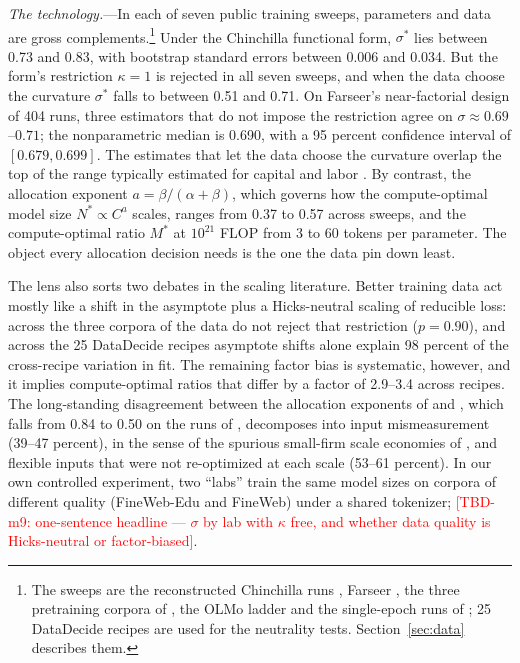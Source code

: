 \textit{The technology.}---In each of seven public training sweeps, parameters and data are gross
complements.\footnote{The sweeps are the reconstructed Chinchilla runs \citep{hoffmann2022training,
besiroglu2024chinchilla}, Farseer \citep{li2025predictableb}, the three pretraining corpora of
\citet{gadre2024language}, the OLMo ladder \citep{bhagia2024establishing} and the single-epoch runs of
\citet{muennighoff2023scaling}; 25 DataDecide recipes \citep{magnusson2025datadecide} are used for the neutrality
tests. Section~\ref{sec:data} describes them.} Under the Chinchilla functional form, $\sigma^*$ lies between 0.73
and 0.83, with bootstrap standard errors between 0.006 and 0.034. But the form's restriction $\kappa = 1$ is rejected
in all seven sweeps, and when the data choose the curvature $\sigma^*$ falls to between 0.51 and 0.71. On Farseer's
near-factorial design of 404 runs, three estimators that do not impose the restriction agree on
$\sigma \approx 0.69$--$0.71$; the nonparametric median is 0.690, with a 95 percent confidence interval of
$[0.679, 0.699]$. The estimates that let the data choose the curvature overlap the top of the range typically
estimated for capital and labor
\citep{chirinko2008sigma, oberfield2021micro}. By contrast, the allocation exponent $a = \beta/(\alpha+\beta)$, which
governs how the compute-optimal model size $N^* \propto C^{a}$ scales, ranges from 0.37 to 0.57 across sweeps, and the
compute-optimal ratio $M^*$ at $10^{21}$ FLOP from 3 to 60 tokens per parameter. The object every allocation decision
needs is the one the data pin down least.

The lens also sorts two debates in the scaling literature. Better training data act mostly like a shift in the
asymptote plus a Hicks-neutral scaling of reducible loss: across the three corpora of \citet{gadre2024language} the
data do not reject that restriction ($p = 0.90$), and across the 25 DataDecide recipes asymptote shifts alone
explain 98 percent of the cross-recipe variation in fit. The remaining factor bias is systematic, however, and it
implies compute-optimal ratios that differ by a factor of 2.9--3.4 across recipes. The long-standing disagreement
between the allocation exponents of \citet{kaplan2020scaling} and \citet{hoffmann2022training}, which falls from 0.84
to 0.50 on the runs of \citet{porian2024resolving}, decomposes into input mismeasurement (39--47 percent), in the
sense of the spurious small-firm scale economies of \citet{nerlove1963returns}, and flexible inputs that were not
re-optimized at each scale (53--61 percent). In our own controlled experiment, two ``labs'' train the same model
sizes on corpora of different quality (FineWeb-Edu and FineWeb) under a shared tokenizer; \textcolor{red}{[TBD-m9:
one-sentence headline --- $\sigma$ by lab with $\kappa$ free, and whether data quality is Hicks-neutral or
factor-biased]}.

